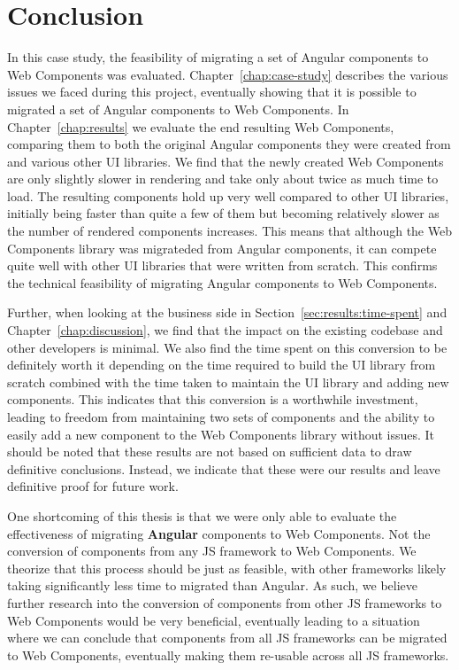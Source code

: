 \chapter{Conclusion}\label{chap:conclusion}

In this case study, the feasibility of migrating a set of Angular components to Web Components was evaluated. Chapter~\ref{chap:case-study} describes the various issues we faced during this project, eventually showing that it is possible to migrated a set of Angular components to Web Components. In Chapter~\ref{chap:results} we evaluate the end resulting Web Components, comparing them to both the original Angular components they were created from and various other UI libraries. We find that the newly created Web Components are only slightly slower in rendering and take only about twice as much time to load. The resulting components hold up very well compared to other UI libraries, initially being faster than quite a few of them but becoming relatively slower as the number of rendered components increases. This means that although the Web Components library was migrateded from Angular components, it can compete quite well with other UI libraries that were written from scratch. This confirms the technical feasibility of migrating Angular components to Web Components.

Further, when looking at the business side in Section~\ref{sec:results:time-spent} and Chapter~\ref{chap:discussion}, we find that the impact on the existing codebase and other developers is minimal. We also find the time spent on this conversion to be definitely worth it depending on the time required to build the UI library from scratch combined with the time taken to maintain the UI library and adding new components. This indicates that this conversion is a worthwhile investment, leading to freedom from maintaining two sets of components and the ability to easily add a new component to the Web Components library without issues. It should be noted that these results are not based on sufficient data to draw definitive conclusions. Instead, we indicate that these were our results and leave definitive proof for future work.

One shortcoming of this thesis is that we were only able to evaluate the effectiveness of migrating \textbf{Angular} components to Web Components. Not the conversion of components from any JS framework to Web Components. We theorize that this process should be just as feasible, with other frameworks likely taking significantly less time to migrated than Angular. As such, we believe further research into the conversion of components from other JS frameworks to Web Components would be very beneficial, eventually leading to a situation where we can conclude that components from all JS frameworks can be migrated to Web Components, eventually making them re-usable across all JS frameworks.